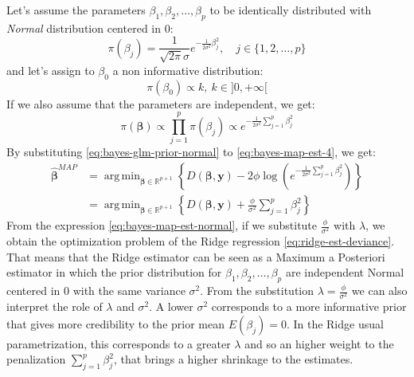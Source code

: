 \documentclass[a4paper, twoside, openright, 12pt]{report}
\DeclareMathOperator*{\argmin}{arg\,min}  %
\theoremstyle{definition}
\theoremstyle{definition}
\theoremstyle{definition}
\theoremstyle{remark}
\begin{document}
Let's assume the parameters \(\beta_1, \beta_2, \dots, \beta_p\) to be identically distributed with \emph{Normal} distribution centered in \(0\):
\[
\pi(\beta_j) = \frac{1}{\sqrt{2\pi}\sigma}e^{-\frac{1}{2\sigma^2}\beta_j^2}, \quad j\in\{1,2,\dots,p\}
\]
and let's assign to \(\beta_0\) a non informative distribution:
\[
\pi(\beta_0) \propto k, \ k\in]0,+\infty[
\]
If we also assume that the parameters are independent, we get:
\begin{equation}
\label{eq:bayes-glm-prior-normal}
\pi(\boldsymbol{\beta}) \propto \prod_{j=1}^{p}{\pi(\beta_j)} \propto e^{-\frac{1}{2\sigma^2}{\sum_{j=1}^{p}{\beta_j^2}}} 
\end{equation}
By substituting \eqref{eq:bayes-glm-prior-normal} to \eqref{eq:bayes-map-est-4}, we get:
\begin{align}
\nonumber
\hat{\boldsymbol{\beta}}^{MAP} & =
\argmin_{\boldsymbol{\beta}\in\mathbb{R}^{p+1}}{\left\{
D(\boldsymbol{\beta}, \boldsymbol{y}) -2\phi \log{\left(e^{-\frac{1}{2\sigma^2}{\sum_{j=1}^{p}{\beta_j^2}}}\right)} \right\}} \\
\label{eq:bayes-map-est-normal}
& = \argmin_{\boldsymbol{\beta}\in\mathbb{R}^{p+1}}{\left\{
D(\boldsymbol{\beta}, \boldsymbol{y}) + \frac{\phi}{\sigma^2} {\sum_{j=1}^{p}{\beta_j^2}}\right\}}
\end{align}
From the expression \eqref{eq:bayes-map-est-normal}, if we substitute \(\frac{\phi}{\sigma^2}\) with \(\lambda\), we obtain the optimization problem of the Ridge regression \eqref{eq:ridge-est-deviance}. That means that the Ridge estimator can be seen as a Maximum a Posteriori estimator in which the prior distribution for \(\beta_1, \beta_2, \dots, \beta_p\) are independent Normal centered in \(0\) with the same variance \(\sigma^2\). From the substitution \(\lambda=\frac{\phi}{\sigma^2}\) we can also interpret the role of \(\lambda\) and \(\sigma^2\). A lower \(\sigma^2\) corresponds to a more informative prior that gives more credibility to the prior mean \(E(\beta_j)=0\). In the Ridge usual parametrization, this corresponds to a greater \(\lambda\) and so an higher weight to the penalization \(\sum_{j=1}^{p}{\beta_j^2}\), that brings a higher shrinkage to the estimates.
\end{document}
